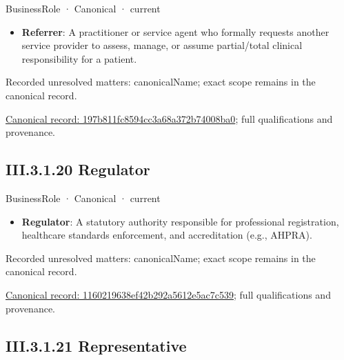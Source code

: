 \label{element:197b811fc8594cc3a68a372b74008ba0}
{\small BusinessRole · Canonical · current}\par

\begin{itemize}


\item \textbf{Referrer}: A practitioner or service agent who formally requests another service provider to assess, manage, or assume partial/total clinical responsibility for a patient.

\end{itemize}

{\small Recorded unresolved matters: canonicalName; exact scope remains in the canonical record.}\par
{\footnotesize \href{../../../../../../../continuum/business/business-role/197b811fc8594cc3a68a372b74008ba0.md}{Canonical record: 197b811fc8594cc3a68a372b74008ba0}; full qualifications and provenance.}\par
\subsection*{III.3.1.20 Regulator}
\label{navigation:III.3.1.20}

\label{element:1160219638ef42b292a5612e5ac7c539}
{\small BusinessRole · Canonical · current}\par

\begin{itemize}


\item \textbf{Regulator}: A statutory authority responsible for professional registration, healthcare standards enforcement, and accreditation (e.g., AHPRA).

\end{itemize}

{\small Recorded unresolved matters: canonicalName; exact scope remains in the canonical record.}\par
{\footnotesize \href{../../../../../../../continuum/business/business-role/1160219638ef42b292a5612e5ac7c539.md}{Canonical record: 1160219638ef42b292a5612e5ac7c539}; full qualifications and provenance.}\par
\subsection*{III.3.1.21 Representative}
\label{navigation:III.3.1.21}

